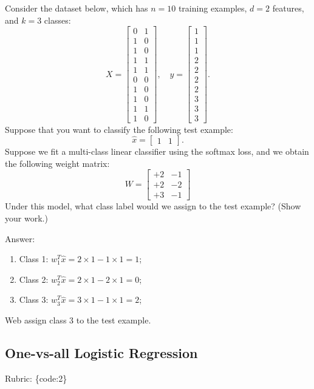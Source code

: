 \documentclass{article}
\def\rubric#1{\gre{Rubric: \{#1\}}}{}
\def\blu#1{{\color{blu}#1}}
\def\gre#1{{\color{gre}#1}}
\begin{document}
Consider the dataset below, which has $n=10$ training examples, $d=2$ features, and $k=3$ classes:
\[
X = \begin{bmatrix}0 & 1\\1 & 0\\ 1 & 0\\ 1 & 1\\ 1 & 1\\ 0 & 0\\  1 & 0\\  1 & 0\\  1 & 1\\  1 &0\end{bmatrix}, \quad y = \begin{bmatrix}1\\1\\1\\2\\2\\2\\2\\3\\3\\3\end{bmatrix}.
\]
Suppose that you want to classify the following test example:
\[
\hat{x} = \begin{bmatrix}1 & 1\end{bmatrix}.
\]
Suppose we fit a multi-class linear classifier using the softmax loss, and we obtain the following weight matrix:
\[
W =
\begin{bmatrix}
+2 & -1\\
+2 & -2\\
+3 & -1
\end{bmatrix}
\]
\blu{Under this model, what class label would we assign to the test example? (Show your work.)}

\gre{
Answer:
\begin{enumerate}
    \item Class 1: $w_1^T \hat{x} = 2\times1 - 1\times 1 = 1$;
    \item Class 2: $w_2^T \hat{x} = 2\times1 - 2\times 1 = 0$;
    \item Class 3: $w_3^T \hat{x} = 3\times1 - 1\times 1 = 2$;
\end{enumerate}
Web assign class 3 to the test example.
}


\subsection{One-vs-all Logistic Regression}
\rubric{code:2}
\end{document}
